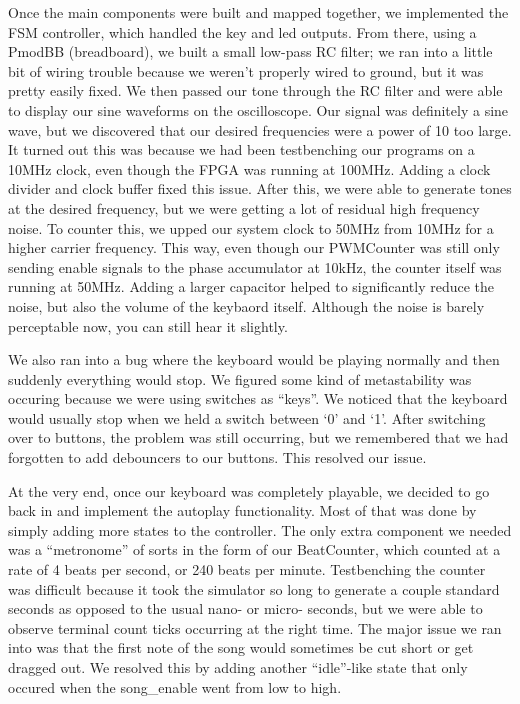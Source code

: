 \documentclass{article}
\begin{document}
    Once the main components were built and mapped together, we implemented the FSM controller, which handled the key and led outputs. From there, using a PmodBB (breadboard), we built a small low-pass RC filter; we ran into a little bit of wiring trouble because we weren't properly wired to ground, but it was pretty easily fixed. We then passed our tone through the RC filter and were able to display our sine waveforms on the oscilloscope. Our signal was definitely a sine wave, but we discovered that our desired frequencies were a power of 10 too large. It turned out this was because we had been testbenching our programs on a 10MHz clock, even though the FPGA was running at 100MHz. Adding a clock divider and clock buffer fixed this issue. After this, we were able to generate tones at the desired frequency, but we were getting a lot of residual high frequency noise. To counter this, we upped our system clock to 50MHz from 10MHz for a higher carrier frequency. This way, even though our PWMCounter was still only sending enable signals to the phase accumulator at 10kHz, the counter itself was running at 50MHz. Adding a larger capacitor helped to significantly reduce the noise, but also the volume of the keybaord itself. Although the noise is barely perceptable now, you can still hear it slightly.

    We also ran into a bug where the keyboard would be playing normally and then suddenly everything would stop. We figured some kind of metastability was occuring because we were using switches as ``keys''. We noticed that the keyboard would usually stop when we held a switch between `0' and `1'. After switching over to buttons, the problem was still occurring, but we remembered that we had forgotten to add debouncers to our buttons. This resolved our issue. 

    At the very end, once our keyboard was completely playable, we decided to go back in and implement the autoplay functionality. Most of that was done by simply adding more states to the controller. The only extra component we needed was a ``metronome'' of sorts in the form of our BeatCounter, which counted at a rate of 4 beats per second, or 240 beats per minute. Testbenching the counter was difficult because it took the simulator so long to generate a couple standard seconds as opposed to the usual nano- or micro- seconds, but we were able to observe terminal count ticks occurring at the right time. The major issue we ran into was that the first note of the song would sometimes be cut short or get dragged out. We resolved this by adding another ``idle''-like state that only occured when the song_enable went from low to high. 
\end{document}
